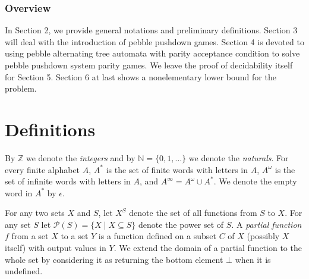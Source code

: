\documentclass[a4paper,UKenglish,cleveref, autoref, thm-restate]{lipics-v2021}
\newcommand{\Z}{\mathbb{Z}}
\newcommand{\N}{\mathbb{N}}
\newcommand{\MSO}{\textsc{MSO}}
\begin{document}
\subsubsection*{Overview}

In Section 2, we provide general notations and preliminary definitions. Section 3 will deal with the introduction of pebble pushdown games.
Section 4 is devoted to using pebble alternating tree automata with parity acceptance condition to solve pebble pushdown system parity games. We leave the proof of decidability itself  for Section 5.
Section 6 at last shows a nonelementary lower bound for the problem.




\section{Definitions}


\newcommand{\LCM}{\mathsf{LCM}}
\newcommand{\LOGSPACE}{\mathsf{LOGSPACE}}
\renewcommand{\MSO}{\mathsf{MSO}}
\newcommand{\SO}{\mathsf{SO}}

By $\Z $ we denote the {\em integers} and by $\N=\{0,1,\ldots\}$ we denote the {\em naturals}.
For every finite alphabet $A$, $A^*$ is the set of finite
words with letters in  $A$, $A^\omega$ is the set of infinite words with letters in $A$, and
 $A^\infty = A^\omega \cup A^*$. We denote the empty word in $A^*$ by $\epsilon$.
%

 For any two sets $X$ and $S$, let $X^S$ denote the set of all functions from $S$ to $X$.
For any set $S$ let 
$\mathcal{P}(S) = \{ X \mid X \subseteq S \}$
denote the power set of $S$.
%
A {\em partial function} $f$ from a set $X$ to a set $Y$ is a function defined on a subset $C$ of $X$ (possibly $X$ itself) with output values in $Y$. We extend the domain of a partial function to the whole set
by considering it as returning the bottom element $\bot$ when it is undefined.
\end{document}
